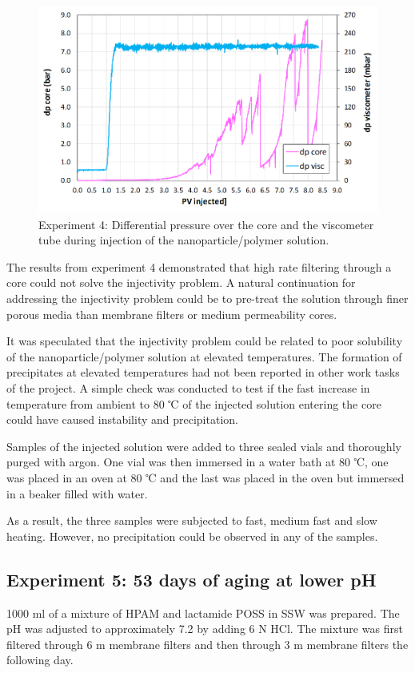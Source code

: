 \begin{figure}[h!]
    \centering
    \includegraphics[width=\textwidth]{img/cht/gelexp4_1.png}
    \caption{Experiment 4: Differential pressure over the core and the viscometer tube during injection of the nanoparticle/polymer solution.}
    \label{cht:gelexp4_1} %
\end{figure}

The results from experiment 4 demonstrated that high rate filtering through a core could not solve the injectivity problem. A natural continuation for addressing the injectivity problem could be to pre-treat the solution through finer porous media than membrane filters or medium permeability cores.

It was speculated that the injectivity problem could be related to poor solubility of the nanoparticle/polymer solution at elevated temperatures. The formation of precipitates at elevated temperatures had not been reported in other work tasks of the project. A simple check was conducted to test if the fast increase in temperature from ambient to 80 ℃ of the injected solution entering the core could have caused instability and precipitation.

Samples of the injected solution were added to three sealed vials and thoroughly purged with argon. One vial was then immersed in a water bath at 80 ℃, one was placed in an oven at 80 ℃ and the last was placed in the oven but immersed in a beaker filled with water.

As a result, the three samples were subjected to fast, medium fast and slow heating. However, no precipitation could be observed in any of the samples.

\subsection{Experiment 5: 53 days of aging at lower pH \label{sec:experiment5}}
1000 ml of a mixture of HPAM and lactamide POSS in SSW was prepared. The pH was adjusted to approximately 7.2 by adding 6 N HCl. The mixture was first filtered through 6 \micro m membrane filters and then through 3 \micro m membrane filters the following day.

